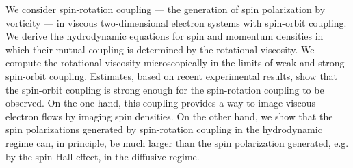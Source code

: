 We consider spin-rotation coupling --- the generation of spin polarization by vorticity --- in viscous two-dimensional electron systems with spin-orbit coupling. We derive the hydrodynamic equations for spin and momentum densities in which their mutual coupling is determined by the rotational viscosity. We compute the rotational viscosity microscopically in the limits of weak and strong spin-orbit coupling. Estimates, based on recent experimental results, show that the spin-orbit coupling is strong enough for the spin-rotation coupling to be observed. On the one hand, this coupling provides a way to image viscous electron flows by imaging spin densities. On the other hand, we show that the spin polarizations generated by spin-rotation coupling in the hydrodynamic regime can, in principle, be much larger than the spin polarization generated, e.g. by the spin Hall effect, in the diffusive regime. 